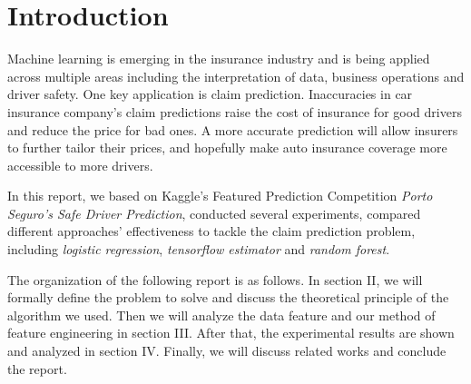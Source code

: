 \documentclass{standalone}
\begin{document}
\section{Introduction}


Machine learning is emerging in the insurance industry and is being applied
across multiple areas including the interpretation of data, business operations
and driver safety. One key application is claim prediction. Inaccuracies in car
insurance company's claim predictions raise the cost of insurance for good
drivers and reduce the price for bad ones. A more accurate prediction will
allow insurers to further tailor their prices, and hopefully make auto
insurance coverage more accessible to more drivers.

In this report, we based on Kaggle's Featured Prediction Competition
\emph{Porto Seguro's Safe Driver Prediction}\cite{kaggle}, conducted several
experiments, compared different approaches' effectiveness to tackle the claim
prediction problem, including \emph{logistic regression}, \emph{tensorflow
estimator} and \emph{random forest}.

The organization of the following report is as follows. In section II, we will
formally define the problem to solve and discuss the theoretical principle of
the algorithm we used. Then we will analyze the data feature and our method of
feature engineering in section III. After that, the experimental results are
shown and analyzed in section IV. Finally, we will discuss related works and
conclude the report.
\end{document}
